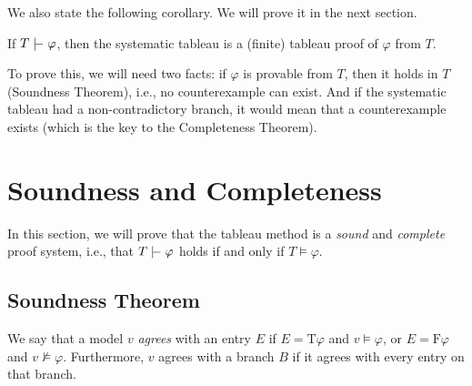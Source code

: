 We also state the following corollary. We will prove it in the next section.

\begin{corollary}\label{corollary:systematicity-of-proofs}
    If $T \proves \varphi$, then the systematic tableau is a (finite) tableau proof of $\varphi$ from $T$.
\end{corollary}

To prove this, we will need two facts: if $\varphi$ is provable from $T$, then it holds in $T$ (Soundness Theorem), i.e., no counterexample can exist. And if the systematic tableau had a non-contradictory branch, it would mean that a counterexample exists (which is the key to the Completeness Theorem).


\section{Soundness and Completeness}

In this section, we will prove that the tableau method is a \emph{sound} and \emph{complete} proof system, i.e., that $T \proves \varphi$ holds if and only if $T \models \varphi$.

\subsection{Soundness Theorem}

We say that a model $v$ \emph{agrees} with an entry $E$ if $E = \mathrm{T}\varphi$ and $v \models \varphi$, or $E = \mathrm{F}\varphi$ and $v \not\models \varphi$. Furthermore, $v$ agrees with a branch $B$ if it agrees with every entry on that branch.

